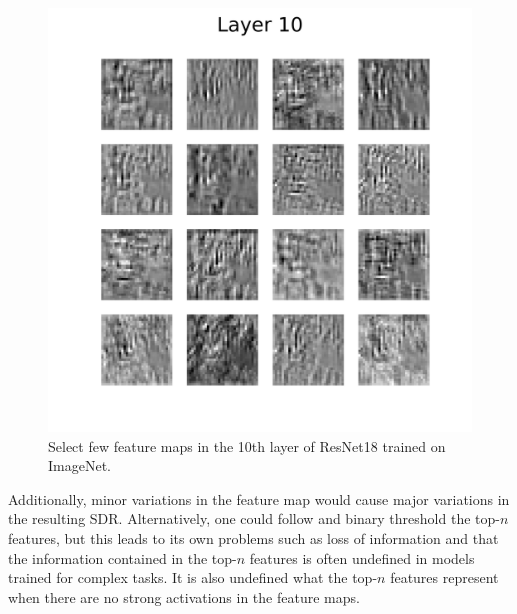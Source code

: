 \begin{figure}[H]
    \centering
    \includegraphics[width=\linewidth]{resources/related_works/resnet18_layer_10.png}
    \caption{Select few feature maps in the 10th layer of ResNet18\cite{resnet} trained on ImageNet\cite{imagenet}.}
    \label{fig:cnn_features}
\end{figure}
\par
Additionally, minor variations in the feature map would cause major variations in the resulting SDR. Alternatively, one could follow \textcite{CNN_HTM} and binary threshold the top-$n$ features, but this leads to its own problems such as loss of information and that the information contained in the top-$n$ features is often undefined in models trained for complex tasks. It is also undefined what the top-$n$ features represent when there are no strong activations in the feature maps.
